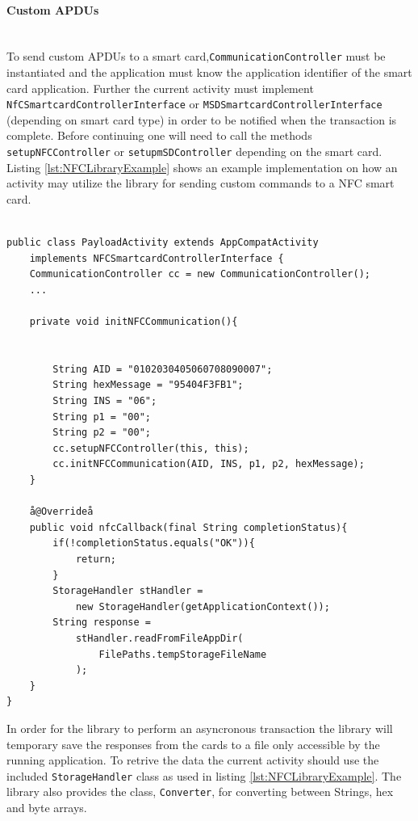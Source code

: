 \paragraph{Custom APDUs}\mbox{}\\
To send custom APDUs to a smart card,\texttt{CommunicationController} must be instantiated and the application must know the application identifier of the smart card application. Further the current activity must implement\\ \texttt{NfCSmartcardControllerInterface} or \texttt{MSDSmartcardControllerInterface} (depending on smart card type) in order to be notified when the transaction is complete. Before continuing one will need to call the methods \texttt{setupNFCController} or \texttt{setupmSDController} depending on the smart card. Listing \ref{lst:NFCLibraryExample} shows an example implementation on how an activity may utilize the library for sending custom commands to a NFC smart card.

\begin{lstlisting}[caption=Java code example showing how to send and receive commands to a NFC smart card., label=lst:NFCLibraryExample,escapechar=å]

public class PayloadActivity extends AppCompatActivity
    implements NFCSmartcardControllerInterface {
    CommunicationController cc = new CommunicationController();
    ...

    private void initNFCCommunication(){


        String AID = "0102030405060708090007";
        String hexMessage = "95404F3FB1";
        String INS = "06";
        String p1 = "00";
        String p2 = "00";
        cc.setupNFCController(this, this);
        cc.initNFCCommunication(AID, INS, p1, p2, hexMessage);
    }

    å@Overrideå
    public void nfcCallback(final String completionStatus){
        if(!completionStatus.equals("OK")){
            return;
        }
        StorageHandler stHandler =
            new StorageHandler(getApplicationContext());
        String response =
            stHandler.readFromFileAppDir(
                FilePaths.tempStorageFileName
            );
    }
}

\end{lstlisting}

In order for the library to perform an asyncronous transaction the library will temporary save the responses from the cards to a file only accessible by the running application. To retrive the data the current activity should use the included \texttt{StorageHandler} class as used in listing \ref{lst:NFCLibraryExample}. The library also provides the class, \texttt{Converter}, for converting between Strings, hex and byte arrays.


